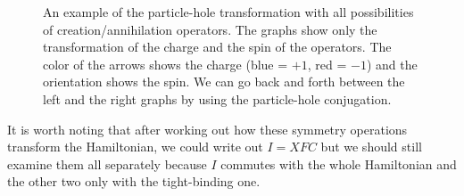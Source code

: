 \begin{figure}
\begin{center}
  \end{center}
  \caption{An example of the particle-hole transformation with all possibilities of creation/annihilation operators. The graphs show only the transformation of the charge and the spin of the operators. The color of the arrows shows the charge (blue = $+1$, red = $-1$) and the orientation shows the spin. We can go back and forth between the left and the right graphs by using the particle-hole conjugation.}
  \label{fig:ph-flip}
\end{figure}

It is worth noting that after working out how these symmetry operations transform the Hamiltonian, we could write out $I = XFC$ but we should still examine them all separately because $I$ commutes with the whole Hamiltonian and the other two only with the tight-binding one.


    

